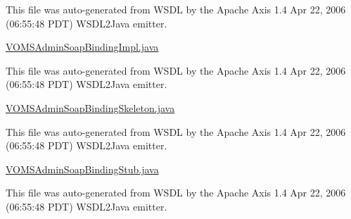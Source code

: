 This file was auto-\/generated from WSDL by the Apache Axis 1.4 Apr 22, 2006 (06:55:48 PDT) WSDL2Java emitter.

\hyperlink{VOMSAdminSoapBindingImpl_8java}{VOMSAdminSoapBindingImpl.java}

This file was auto-\/generated from WSDL by the Apache Axis 1.4 Apr 22, 2006 (06:55:48 PDT) WSDL2Java emitter.

\hyperlink{VOMSAdminSoapBindingSkeleton_8java}{VOMSAdminSoapBindingSkeleton.java}

This file was auto-\/generated from WSDL by the Apache Axis 1.4 Apr 22, 2006 (06:55:48 PDT) WSDL2Java emitter.

\hyperlink{VOMSAdminSoapBindingStub_8java}{VOMSAdminSoapBindingStub.java}

This file was auto-\/generated from WSDL by the Apache Axis 1.4 Apr 22, 2006 (06:55:48 PDT) WSDL2Java emitter. 